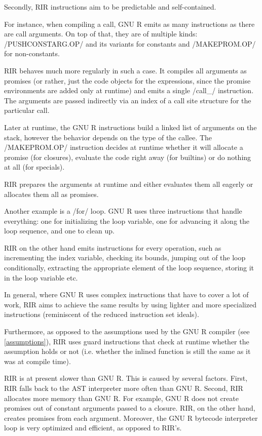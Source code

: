 Secondly, RIR instructions aim to be predictable and self-contained.

For instance, when compiling a call, GNU R emits as many instructions as there are call arguments. On top of that, they are of multiple kinds: \rinline/PUSHCONSTARG.OP/ and its variants for constants and \rinline/MAKEPROM.OP/ for non-constants.

RIR behaves much more regularly in such a case. It compiles all arguments as promises (or rather, just the code objects for the expressions, since the promise environments are added only at runtime) and emits a single \cinline/call_/ instruction. The arguments are passed indirectly via an index of a call site structure for the particular call.

Later at runtime, the GNU R instructions build a linked list of arguments on the stack, however the behavior depends on the type of the callee. The \rinline/MAKEPROM.OP/ instruction decides at runtime whether it will allocate a promise (for closures), evaluate the code right away (for builtins) or do nothing at all (for specials).

RIR prepares the arguments at runtime and either evaluates them all eagerly or allocates them all as promises.

Another example is a \rinline/for/ loop. GNU R uses three instructions that handle everything: one for initializing the loop variable, one for advancing it along the loop sequence, and one to clean up.

RIR on the other hand emits instructions for every operation, such as incrementing the index variable, checking its bounds, jumping out of the loop conditionally, extracting the appropriate element of the loop sequence, storing it in the loop variable etc.

In general, where GNU R uses complex instructions that have to cover a lot of work, RIR aims to achieve the same results by using lighter and more specialized instructions (reminiscent of the reduced instruction set ideals).

Furthermore, as opposed to the assumptions used by the GNU R compiler (see \ref{assumptions}), RIR uses guard instructions that check at runtime whether the assumption holds or not (i.e. whether the inlined function is still the same as it was at compile time).

RIR is at present slower than GNU R. This is caused by several factors. First, RIR falls back to the AST interpreter more often than GNU R. Second, RIR allocates more memory than GNU R. For example, GNU R does not create promises out of constant arguments passed to a closure. RIR, on the other hand, creates promises from each argument. Moreover, the GNU R bytecode interpreter loop is very optimized and efficient, as opposed to RIR's.

